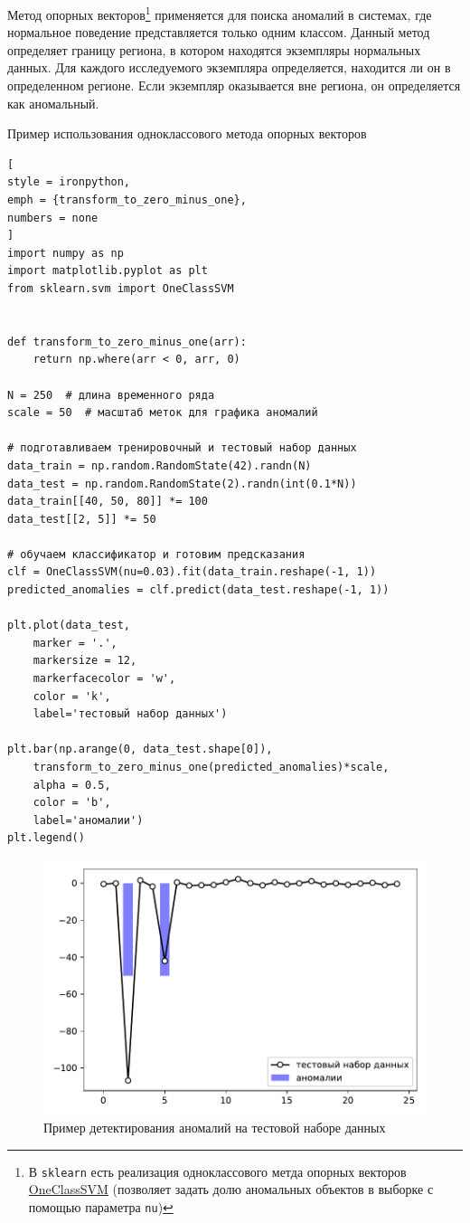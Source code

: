 \documentclass[%
	11pt,
	a4paper,
	utf8,
		]{article}
\begin{document}
Метод опорных векторов\footnote{В \texttt{sklearn} есть реализация одноклассового метда опорных векторов \href{https://scikit-learn.org/stable/modules/generated/sklearn.svm.OneClassSVM.html}{\ttfamily OneClassSVM} (позволяет задать долю аномальных объектов в выборке с помощью параметра \texttt{nu})} применяется для поиска аномалий в системах, где нормальное поведение представляется только одним классом. Данный метод определяет границу региона, в котором находятся экземпляры нормальных данных. Для каждого исследуемого экземпляра определяется, находится ли он в определенном регионе. Если экземпляр оказывается вне региона, он определяется как аномальный.

Пример использования одноклассового метода опорных векторов
\begin{lstlisting}[
style = ironpython,
emph = {transform_to_zero_minus_one},
numbers = none
]
import numpy as np
import matplotlib.pyplot as plt
from sklearn.svm import OneClassSVM


def transform_to_zero_minus_one(arr):
    return np.where(arr < 0, arr, 0)

N = 250  # длина временного ряда
scale = 50  # масштаб меток для графика аномалий

# подготавливаем тренировочный и тестовый набор данных
data_train = np.random.RandomState(42).randn(N)
data_test = np.random.RandomState(2).randn(int(0.1*N))
data_train[[40, 50, 80]] *= 100
data_test[[2, 5]] *= 50

# обучаем классификатор и готовим предсказания
clf = OneClassSVM(nu=0.03).fit(data_train.reshape(-1, 1))
predicted_anomalies = clf.predict(data_test.reshape(-1, 1))

plt.plot(data_test,
    marker = '.',
    markersize = 12,
    markerfacecolor = 'w',
    color = 'k',
    label='тестовый набор данных')

plt.bar(np.arange(0, data_test.shape[0]),
    transform_to_zero_minus_one(predicted_anomalies)*scale,
    alpha = 0.5,
    color = 'b',
    label='аномалии')
plt.legend()
\end{lstlisting}

\begin{figure}[h]
	\centering
	\includegraphics[scale=0.55]{figures/oneclasssvm_test.pdf}
	\caption{ Пример детектирования аномалий на тестовой наборе данных }\label{fig:oneclasssvm}
\end{figure}
\end{document}

